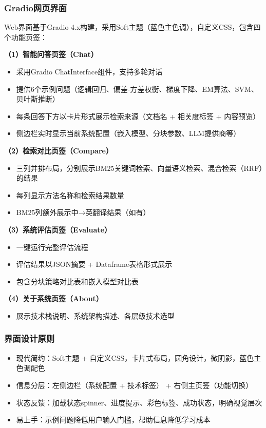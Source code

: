 \documentclass[10pt,a4paper]{article}
\begin{document}
\subsubsection{Gradio网页界面}

Web界面基于Gradio 4.x构建，采用Soft主题（蓝色主色调），自定义CSS，包含四个功能页签：

\textbf{（1）智能问答页签（Chat）}
\begin{itemize}
\item 采用Gradio ChatInterface组件，支持多轮对话
\item 提供6个示例问题（逻辑回归、偏差-方差权衡、梯度下降、EM算法、SVM、贝叶斯推断）
\item 每条回答下方以卡片形式展示检索来源（文档名 + 相关度标签 + 内容预览）
\item 侧边栏实时显示当前系统配置（嵌入模型、分块参数、LLM提供商等）
\end{itemize}

\textbf{（2）检索对比页签（Compare）}
\begin{itemize}
\item 三列并排布局，分别展示BM25关键词检索、向量语义检索、混合检索（RRF）的结果
\item 每列显示方法名称和检索结果数量
\item BM25列额外展示中→英翻译结果（如有）
\end{itemize}

\textbf{（3）系统评估页签（Evaluate）}
\begin{itemize}
\item 一键运行完整评估流程
\item 评估结果以JSON摘要 + Dataframe表格形式展示
\item 包含分块策略对比表和嵌入模型对比表
\end{itemize}

\textbf{（4）关于系统页签（About）}
\begin{itemize}
\item 展示技术栈说明、系统架构描述、各层级技术选型
\end{itemize}

\subsubsection{界面设计原则}
\begin{itemize}
\item 现代简约：Soft主题 + 自定义CSS，卡片式布局，圆角设计，微阴影，蓝色主色调配色
\item 信息分层：左侧边栏（系统配置 + 技术标签） + 右侧主页签（功能切换）
\item 状态反馈：加载状态spinner、进度提示、彩色标签、成功状态，明确视觉层次
\item 易上手：示例问题降低用户输入门槛，帮助信息降低学习成本
\end{itemize}
\end{document}
